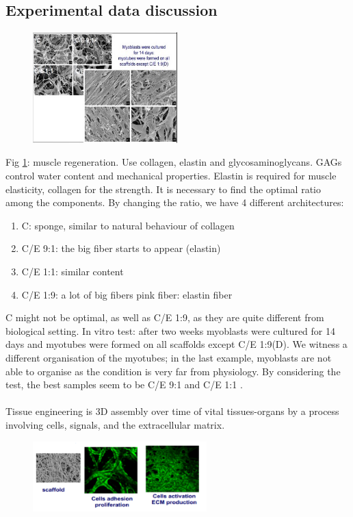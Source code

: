 \subsection{Experimental data discussion}
\begin{figure}[h]
\centering
\includegraphics[width=0.5\textwidth]{myoblast.jpg}
\caption{\label{fig:myoblast}}
\end{figure}
\noindent
Fig \ref{fig:myoblast}: muscle regeneration. Use collagen, elastin and glycosaminoglycans. GAGs control water content and mechanical properties. Elastin is required for muscle elasticity, collagen for the strength.
It is necessary to find the optimal ratio among the components.
By changing the ratio,  we have 4 different architectures:
\begin{enumerate}
\item C: sponge, similar to natural behaviour of collagen
\item C/E 9:1: the big fiber starts to appear (elastin)
\item C/E 1:1: similar content
\item C/E 1:9: a lot of big fibers pink fiber: elastin fiber
\end{enumerate}
\noindent
C might not be optimal, as well as C/E 1:9, as they are quite different from biological setting.
In vitro test: after two weeks myoblasts were cultured for 14 days and myotubes were formed on all scaffolds except C/E 1:9(D).  We witness a different organisation of the myotubes; in the last example, myoblasts are not able to organise as the condition is very far from physiology.
By considering the test, the best samples seem to be C/E 9:1 and C/E 1:1 .
\\
\\
\noindent
Tissue engineering is 3D assembly over time of vital tissues-organs by a process involving cells, signals, and the extracellular matrix.
\begin{figure}[h]
\centering
\includegraphics[width=0.6\textwidth]{3D.png}
\caption{\label{fig:3D}}
\end{figure}
